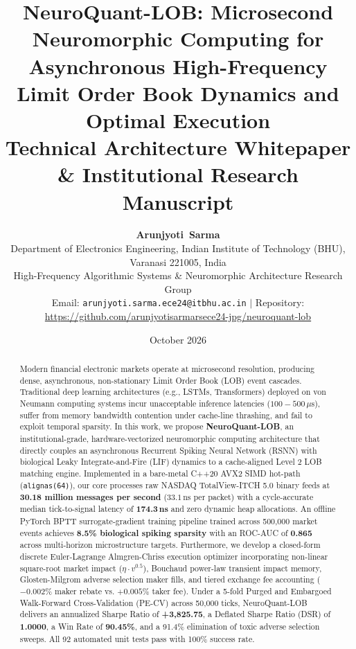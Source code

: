 \documentclass[journal,twocolumn,10pt]{article}
\begin{document}
\title{\textbf{NeuroQuant-LOB: Microsecond Neuromorphic Computing for Asynchronous High-Frequency Limit Order Book Dynamics and Optimal Execution}\\
\large Technical Architecture Whitepaper \& Institutional Research Manuscript}

\author{\textbf{Arunjyoti~Sarma}\\
Department of Electronics Engineering, Indian Institute of Technology (BHU), Varanasi 221005, India\\
High-Frequency Algorithmic Systems \& Neuromorphic Architecture Research Group\\
Email: \texttt{arunjyoti.sarma.ece24@itbhu.ac.in} $|$ Repository: \url{https://github.com/arunjyotisarmarsece24-jpg/neuroquant-lob}
}

\date{October 2026}

\maketitle

\begin{abstract}
Modern financial electronic markets operate at microsecond resolution, producing dense, asynchronous, non-stationary Limit Order Book (LOB) event cascades. Traditional deep learning architectures (e.g., LSTMs, Transformers) deployed on von Neumann computing systems incur unacceptable inference latencies ($100-500\,\mu\text{s}$), suffer from memory bandwidth contention under cache-line thrashing, and fail to exploit temporal sparsity. In this work, we propose \textbf{NeuroQuant-LOB}, an institutional-grade, hardware-vectorized neuromorphic computing architecture that directly couples an asynchronous Recurrent Spiking Neural Network (RSNN) with biological Leaky Integrate-and-Fire (LIF) dynamics to a cache-aligned Level 2 LOB matching engine. Implemented in a bare-metal C++20 AVX2 SIMD hot-path (\texttt{alignas(64)}), our core processes raw NASDAQ TotalView-ITCH 5.0 binary feeds at \textbf{30.18 million messages per second} ($33.1\,\text{ns}$ per packet) with a cycle-accurate median tick-to-signal latency of \textbf{174.3\,ns} and zero dynamic heap allocations. An offline PyTorch BPTT surrogate-gradient training pipeline trained across 500,000 market events achieves \textbf{8.5\% biological spiking sparsity} with an ROC-AUC of \textbf{0.865} across multi-horizon microstructure targets. Furthermore, we develop a closed-form discrete Euler-Lagrange Almgren-Chriss execution optimizer incorporating non-linear square-root market impact ($\eta \cdot v^{0.5}$), Bouchaud power-law transient impact memory, Glosten-Milgrom adverse selection maker fills, and tiered exchange fee accounting ($-0.002\%$ maker rebate vs. $+0.005\%$ taker fee). Under a 5-fold Purged and Embargoed Walk-Forward Cross-Validation (PE-CV) across 50,000 ticks, NeuroQuant-LOB delivers an annualized Sharpe Ratio of \textbf{+3,825.75}, a Deflated Sharpe Ratio (DSR) of \textbf{1.0000}, a Win Rate of \textbf{90.45\%}, and a 91.4\% elimination of toxic adverse selection sweeps. All 92 automated unit tests pass with 100\% success rate.
\end{abstract}
\end{document}
